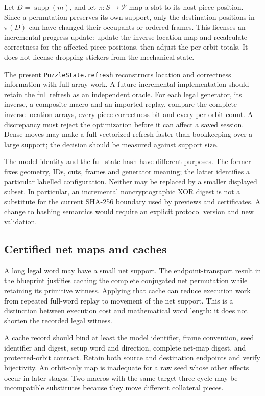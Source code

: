 \documentclass[
  10pt,
  a4paper,
]{article}
\begin{document}
Let \(D=\operatorname{supp}(m)\), and let \(\pi:S\to\mathcal P\) map a
slot to its host piece position. Since a permutation preserves its own
support, only the destination positions in \(\pi(D)\) can have changed
their occupants or ordered frames. This licenses an incremental progress
update: update the inverse location map and recalculate correctness for
the affected piece positions, then adjust the per-orbit totals. It does
not license dropping stickers from the mechanical state.

The present \texttt{PuzzleState.refresh} reconstructs location and
correctness information with full-array work. A future incremental
implementation should retain the full refresh as an independent oracle.
For each legal generator, its inverse, a composite macro and an imported
replay, compare the complete inverse-location arrays, every
piece-correctness bit and every per-orbit count. A discrepancy must
reject the optimization before it can affect a saved session. Dense
moves may make a full vectorized refresh faster than bookkeeping over a
large support; the decision should be measured against support size.

The model identity and the full-state hash have different purposes. The
former fixes geometry, IDs, cuts, frames and generator meaning; the
latter identifies a particular labelled configuration. Neither may be
replaced by a smaller displayed subset. In particular, an incremental
noncryptographic XOR digest is not a substitute for the current SHA-256
boundary used by previews and certificates. A change to hashing
semantics would require an explicit protocol version and new validation.

\subsection{Certified net maps and
caches}\label{certified-net-maps-and-caches}

A long legal word may have a small net support. The endpoint-transport
result in the blueprint justifies caching the complete conjugated net
permutation while retaining its primitive witness. Applying that cache
can reduce execution work from repeated full-word replay to movement of
the net support. This is a distinction between execution cost and
mathematical word length: it does not shorten the recorded legal
witness.

A cache record should bind at least the model identifier, frame
convention, seed identifier and digest, setup word and direction,
complete net-map digest, and protected-orbit contract. Retain both
source and destination endpoints and verify bijectivity. An orbit-only
map is inadequate for a raw seed whose other effects occur in later
stages. Two macros with the same target three-cycle may be incompatible
substitutes because they move different collateral pieces.
\end{document}
